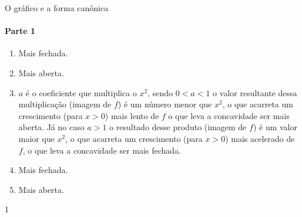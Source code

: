 \clearmargin
\marginpar{\vspace{.5em}}
\begin{answer}{O gráfico e a forma canônica}
{
\paragraph{Parte 1}

\begin{enumerate}
\item {} 
Mais fechada.

\item {} 
Mais aberta.

\item {} 
\(a\) é o coeficiente que multiplica o \(x^2\), sendo \(0<a<1\) o valor resultante dessa multiplicação (imagem de \(f\)) é um número menor que \(x^2\), o que acarreta um crescimento (para \(x>0\)) mais lento de \(f\) o que leva a concavidade ser mais aberta. Já no caso \(a>1\) o resultado desse produto (imagem de \(f\)) é um valor maior que \(x^2\), o que acarreta um crescimento (para \(x>0\)) mais acelerado de \(f\), o que leva a concavidade ser mais fechada.

\item {} 
Mais fechada.

\item {} 
Mais aberta.
\end{enumerate}
}{1}
\end{answer}
\clearmargin
\marginpar{\vspace{.5em}}

